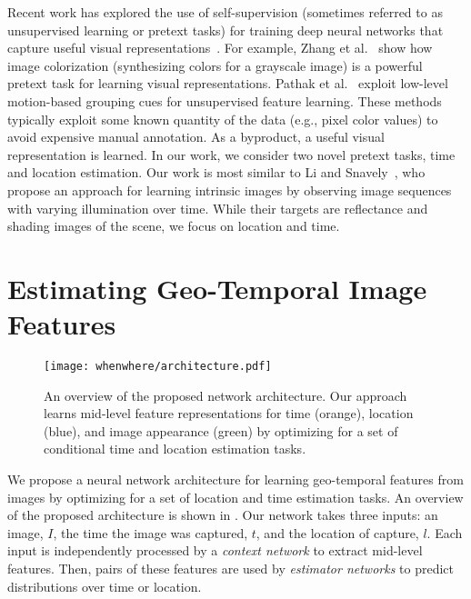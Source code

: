 Recent work has explored the use of self-supervision (sometimes
referred to as unsupervised learning or pretext tasks) for training
deep neural networks that capture useful visual
representations~\cite{doersch2015unsupervised,pathak2016context}. For
example, Zhang et al.~\cite{zhang2016colorful} show how image
colorization (synthesizing colors for a grayscale image) is a powerful
pretext task for learning visual representations. Pathak et
al.~\cite{pathak2017learning} exploit low-level motion-based grouping
cues for unsupervised feature learning. These methods typically
exploit some known quantity of the data (e.g., pixel color values) to
avoid expensive manual annotation. As a byproduct, a useful visual
representation is learned. In our work, we consider two novel pretext
tasks, time and location estimation. Our work is most similar to Li
and Snavely~\cite{li2018learning}, who propose an approach for
learning intrinsic images by observing image sequences with varying
illumination over time. While their targets are reflectance and
shading images of the scene, we focus on location and time.


\section{Estimating Geo-Temporal Image Features}
\label{sec:when-and-where}

\begin{figure}[t]
  \centering

  \texttt{[image: whenwhere/architecture.pdf]}
  \caption{An overview of the proposed network architecture. Our
  approach learns mid-level feature representations for time (orange),
  location (blue), and image appearance (green) by optimizing for a set
  of conditional time and location estimation tasks.}
  
  \label{fig:architecture}
\end{figure}

We propose a neural network architecture for learning geo-temporal
features from images by optimizing for a set of
location and time estimation tasks. An overview of the proposed
architecture is shown in . Our network takes
three inputs: an image, $I$, the time the image was captured, $t$, and
the location of capture, $l$. Each input is independently processed by
a {\em context network} to extract mid-level features. Then, pairs of
these features are used by {\em estimator networks} to predict
distributions over time or location.

